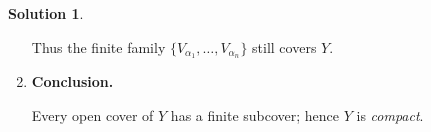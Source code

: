 \documentclass[12pt]{article}
\theoremstyle{definition} %
\newtheorem{solution}{Solution}
\theoremstyle{plain} %
\begin{document}
\begin{solution}
\begin{enumerate}[]
        Thus the finite family \(\{V_{\alpha_1},\dots,V_{\alpha_n}\}\) still covers \(Y\).
        
        \item \textbf{Conclusion.}
        
        Every open cover of \(Y\) has a finite subcover;
        hence \(Y\) is \emph{compact}.
        \end{enumerate}
        \end{solution}
\end{document}
